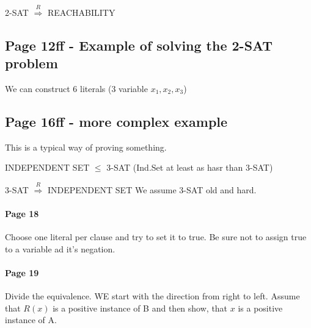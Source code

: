 \documentclass[a4paper]{article}
\begin{document}
2-SAT $\stackrel{R}{\Longrightarrow}$ REACHABILITY



\subsection{Page 12ff - Example of solving the 2-SAT problem}
We can construct 6 literals (3 variable $x_1, x_2, x_3$)

 \begin{center}
	\fbox{\begin{minipage}{15em}
            \begin{tabbing}
            \hspace*{2em}\= \kill %
 
            $\alpha \rightarrow \beta \equiv \neg \alpha \vee \beta$ \\
            $(\alpha \vee \beta) \equiv \neg \alpha \rightarrow \beta $ \\
            $(\alpha \vee \beta) \equiv \neg \beta \rightarrow \alpha $\\


            \end{tabbing}
     \end{minipage}}
\end{center}


\subsection{Page 16ff - more complex example}

This is a typical way of proving something.


INDEPENDENT SET $\leq$ 3-SAT (Ind.Set at least as hasr than 3-SAT)

3-SAT $\stackrel{R}{\Longrightarrow}$ INDEPENDENT SET
We assume 3-SAT old and hard.

\paragraph{Page 18} Choose one literal per clause and try to set it to true. Be
sure not to assign true to a variable ad it's negation.


\paragraph{Page 19} Divide the equivalence. WE start with the direction from
right to left. Assume that $R(x)$ is a positive instance of B and then show,
that $x$ is a positive instance of A.
\end{document}
